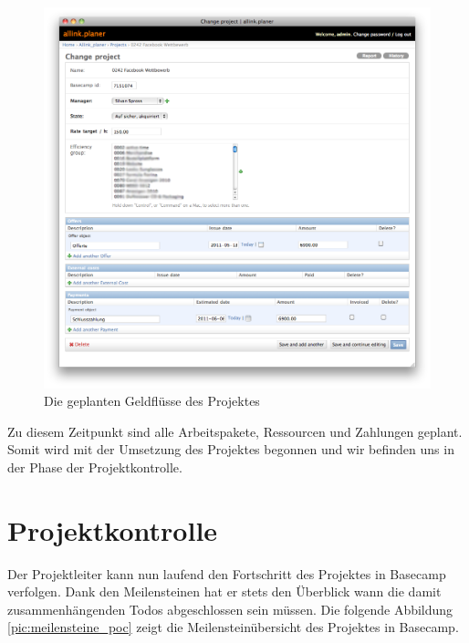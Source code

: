 \begin{figure}[htbp]
\begin{center}
\includegraphics[width=1.0\textwidth,angle=0]{./bilder/proof_of_concept/geldfluessse_poc.png}
\caption[Die geplanten Geldflüsse des Projektes]{Die geplanten Geldflüsse des Projektes\footnotemark}
\label{pic:geldfluessse_poc}
\end{center}
\end{figure}

Zu diesem Zeitpunkt sind alle Arbeitspakete, Ressourcen und Zahlungen geplant.
Somit wird mit der Umsetzung des Projektes begonnen und wir befinden uns in der
Phase der Projektkontrolle.

\section{Projektkontrolle}
Der Projektleiter kann nun laufend den Fortschritt des Projektes in Basecamp
verfolgen. Dank den Meilensteinen hat er stets den Überblick wann die damit
zusammenhängenden Todos abgeschlossen sein müssen. Die folgende Abbildung
\ref{pic:meilensteine_poc} zeigt die Meilensteinübersicht des Projektes in Basecamp.

